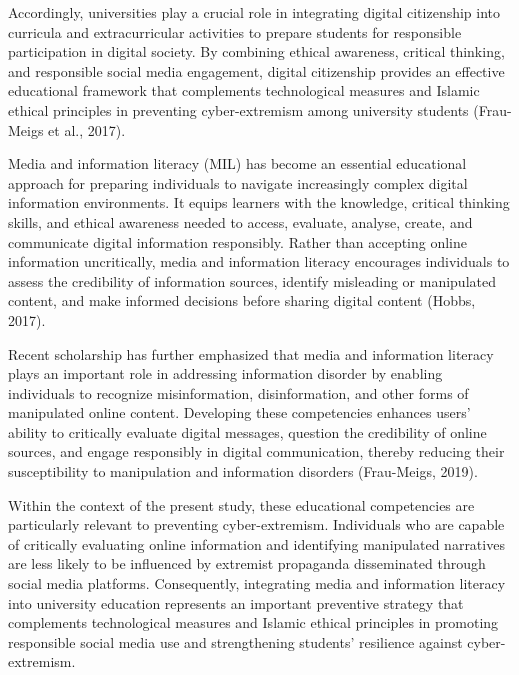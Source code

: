 \documentclass[10pt]{NSP1}
\begin{document}
Accordingly, universities play a crucial role in integrating digital citizenship into curricula and extracurricular activities to prepare students for responsible participation in digital society. By combining ethical awareness, critical thinking, and responsible social media engagement, digital citizenship provides an effective educational framework that complements technological measures and Islamic ethical principles in preventing cyber-extremism among university students (Frau-Meigs et al., 2017).

\par\medskip{}\smallskip

Media and information literacy (MIL) has become an essential educational approach for preparing individuals to navigate increasingly complex digital information environments. It equips learners with the knowledge, critical thinking skills, and ethical awareness needed to access, evaluate, analyse, create, and communicate digital information responsibly. Rather than accepting online information uncritically, media and information literacy encourages individuals to assess the credibility of information sources, identify misleading or manipulated content, and make informed decisions before sharing digital content (Hobbs, 2017).

Recent scholarship has further emphasized that media and information literacy plays an important role in addressing information disorder by enabling individuals to recognize misinformation, disinformation, and other forms of manipulated online content. Developing these competencies enhances users' ability to critically evaluate digital messages, question the credibility of online sources, and engage responsibly in digital communication, thereby reducing their susceptibility to manipulation and information disorders (Frau-Meigs, 2019).

Within the context of the present study, these educational competencies are particularly relevant to preventing cyber-extremism. Individuals who are capable of critically evaluating online information and identifying manipulated narratives are less likely to be influenced by extremist propaganda disseminated through social media platforms. Consequently, integrating media and information literacy into university education represents an important preventive strategy that complements technological measures and Islamic ethical principles in promoting responsible social media use and strengthening students' resilience against cyber-extremism.
\end{document}
